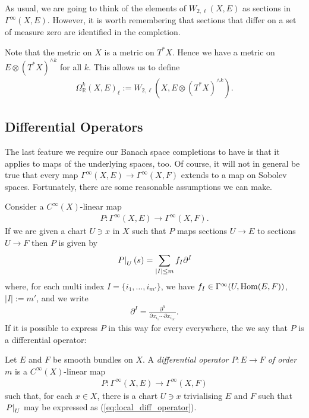 \documentclass[12pt]{ociamthesis}  %
\begin{document}
As usual, we are going to think of the elements of $W_{2,\ell}(X,E)$ as
sections in $\Gamma^\infty(X,E)$. However, it is worth remembering that
sections that differ on a set of measure zero are identified in the
completion.

\begin{example}
  Note that the metric on $X$ is a metric on $T^*X$. Hence we have
  a metric on $E\otimes (T^*X)^{\wedge k}$ for all $k$. This allows
  us to define
  \begin{align*}
    \Omega_{\mathbb{R}}^k(X,E)_\ell := W_{2,\ell}(X,E\otimes(T^*X)^{\wedge k}).
  \end{align*}
\end{example}

\subsection{Differential Operators}

The last feature we require our Banach space completions to have is
that it applies to maps of the underlying spaces, too. Of course,
it will not in general be true that every map
$\Gamma^\infty(X,E)\to\Gamma^\infty(X,F)$ extends to a map on
Sobolev spaces. Fortunately, there are some reasonable assumptions
we can make.

Consider a $C^\infty(X)$-linear map
\begin{align*}
  P : \Gamma^\infty(X,E) \to \Gamma^\infty(X,F).
\end{align*}
If we are given a chart $U\ni x$ in $X$ such that $P$ maps sections
$U\to E$ to sections $U\to F$ then $P$ is given by
\begin{align}\label{eq:local_diff_operator}
  \left.{P}\right\vert_{U}(s) = \sum_{|I|\leq m} f_I \partial^I
\end{align}
where, for each multi index $I=\{i_1,\ldots,i_{m'}\}$, we have
$f_I\in\Gamma^\infty(U,\operatorname{Hom}(E,F))$, $|I| := m'$, and we write
\begin{align*}
  \partial^I = \frac{\partial^n}{\partial x_{i_1} \cdots \partial x_{i_{m'}}}.
\end{align*}
If it is possible to express $P$ in this way for every everywhere,
the we say that $P$ is a differential operator:

\begin{definition}\label{def:diff_operator}
  Let $E$ and $F$ be smooth bundles on $X$. A \emph{differential
    operator $P:E\to F$ of order $m$} is a $C^\infty(X)$-linear map
  \begin{align*}
    P : \Gamma^\infty(X,E) \to \Gamma^\infty(X,F)
  \end{align*}
  such that, for each $x\in X$, there is a chart $U\ni x$ trivialising $E$ and
  $F$ such that $\left.{P}\right\vert_{U}$ may be expressed as
  (\ref{eq:local_diff_operator}).
\end{definition}
\end{document}

